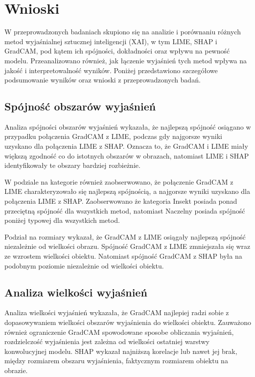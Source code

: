 
\chapter*{Wnioski}

W przeprowadzonych badaniach skupiono się na analizie i porównaniu różnych metod wyjaśnialnej sztucznej inteligencji (XAI), w tym LIME, SHAP i GradCAM, pod kątem ich spójności, dokładności oraz wpływu na pewność modelu.
Przeanalizowano również, jak łączenie wyjaśnień tych metod wpływa na jakość i interpretowalność wyników.
Poniżej przedstawiono szczegółowe podsumowanie wyników oraz wnioski z przeprowadzonych badań.

\section*{Spójność obszarów wyjaśnień}

Analiza spójności obszarów wyjaśnień wykazała, że najlepszą spójność osiągano w przypadku połączenia GradCAM z LIME, podczas gdy najgorsze wyniki uzyskano dla połączenia LIME z SHAP.
Oznacza to, że GradCAM i LIME miały większą zgodność co do istotnych obszarów w obrazach, natomiast LIME i SHAP identyfikowały te obszary bardziej rozbieżnie.

W podziale na kategorie również zaobserwowano, że połączenie GradCAM z LIME charakteryzowało się najlepszą spójnością, a najgorsze wyniki uzyskano dla połączenia LIME z SHAP.
Zaobserwowano że kategoria Insekt posiada ponad przeciętną spójność dla wszystkich metod, natomiast Naczelny posiada spójność poniżej typowej dla wszystkich metod.

Podział na rozmiary wykazał, że GradCAM z LIME osiągały najlepszą spójność niezależnie od wielkości obrazu.
Spójność GradCAM z LIME zmniejszała się wraz ze wzrostem wielkości obiektu.
Natomiast spójność GradCAM z SHAP była na podobnym poziomie niezależnie od wielkości obiektu.

\section*{Analiza wielkości wyjaśnień}

Analiza wielkości wyjaśnień wykazała, że GradCAM najlepiej radzi sobie z dopasowywaniem wielkości obszarów wyjaśnienia do wielkości obiektu.
Zauważono również ograniczenie GradCAM spowodowane sposobe obliczania wyjaśnień, rozdzielczość wyjaśnienia jest zależna od wielkości ostatniej warstwy konwolucyjnej modelu.
SHAP wykazał najniższą korelacje lub nawet jej brak, między rozmiarem obszaru wyjaśnienia, faktycznym rozmiarem obiektu na obrazie.

